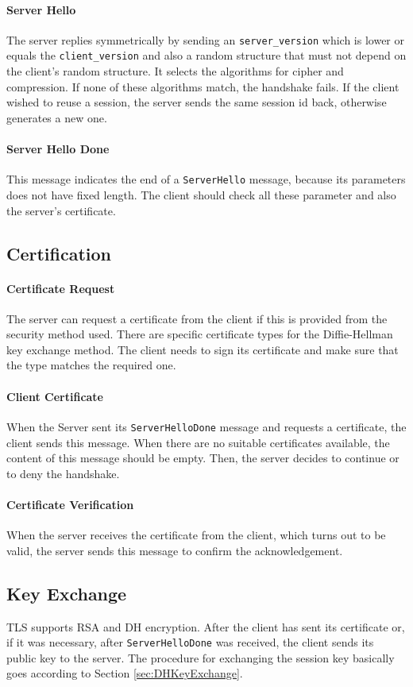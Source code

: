 \documentclass[paper=a4, fontsize=11pt]{scrartcl} %
\numberwithin{equation}{section} %
\numberwithin{figure}{section} %
\numberwithin{table}{section} %
\begin{document}
\paragraph{Server Hello} The server replies symmetrically by sending an \verb|server_version| which is lower or equals the \verb|client_version| and also a random structure that must not depend on the client's random structure. It selects the algorithms for cipher and compression. If none of these algorithms match, the handshake fails. If the client wished to reuse a session, the server sends the same session id back, otherwise generates a new one.
\paragraph{Server Hello Done}
This message indicates the end of a \verb|ServerHello| message, because its parameters does not have fixed length. The client should check all these parameter and also the server's certificate.

\subsection{Certification}
\paragraph{Certificate Request}
The server can request a certificate from the client if this is provided from the security method used. There are specific certificate types for the Diffie-Hellman key exchange method. The client needs to sign its certificate and make sure that the type matches the required one.
\paragraph{Client Certificate}
When the Server sent its \verb|ServerHelloDone| message and requests a certificate, the client sends this message. When there are no suitable certificates available, the content of this message should be empty. Then, the server decides to continue or to deny the handshake.
\paragraph{Certificate Verification}
When the server receives the certificate from the client, which turns out to be valid, the server sends this message to confirm the acknowledgement.

\subsection{Key Exchange}
TLS supports RSA and DH encryption. After the client has sent its certificate or, if it was necessary, after \verb|ServerHelloDone| was received, the client sends its public key to the server. The procedure for exchanging the session key basically goes according to Section \ref{sec:DHKeyExchange}.
\end{document}
